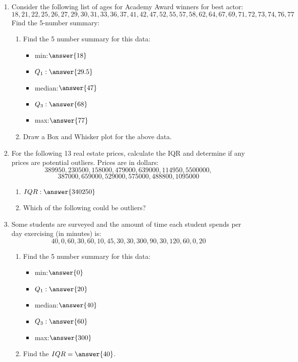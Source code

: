 \documentclass{ximera}
\begin{document}
 
\begin{enumerate}
\item Consider the following list of ages for Academy Award winners for best actor:
$$18, 21, 22, 25, 26, 27, 29, 30, 31, 33, 36, 37, 41, 42, 47, 52, 55, 57, 58, 62, 64, 67, 69, 71, 72, 73, 74, 76, 77$$
Find the 5-number summary:
\begin{enumerate}
\item Find the 5 number summary for this data:
\begin{itemize}
\item min:$\answer{18}$
\item $Q_1:\answer{29.5}$
\item median:$\answer{47}$
\item $Q_3:\answer{68}$
\item max:$\answer{77}$
\end{itemize}
\item Draw a Box and Whisker plot for the above data.
\end{enumerate}

\item For the following 13 real estate prices, calculate the IQR and determine if any prices are potential outliers. Prices are in dollars:
$$389950, 230500, 158000, 479000, 639000, 114950, 5500000,$$ $$ 387000, 659000, 529000, 575000, 488800, 1095000$$
\begin{enumerate}
\item $IQR:\answer{340250}$
\item Which of the following could be outliers?
\begin{multipleChoice}
\end{multipleChoice}

\end{enumerate}

\item Some students are surveyed and the amount of time each student spends per day exercising (in minutes) is: $$40,0,60,30,60,10,45,30,30,300,90,30,120,60,0,20$$
\begin{enumerate}
\item Find the 5 number summary for this data:
\begin{itemize}
\item min:$\answer{0}$
\item $Q_1:\answer{20}$
\item median:$\answer{40}$
\item $Q_3:\answer{60}$
\item max:$\answer{300}$
\end{itemize}
\item Find the $IQR=\answer{40}$.
\end{enumerate}


\end{enumerate}
\end{document}
